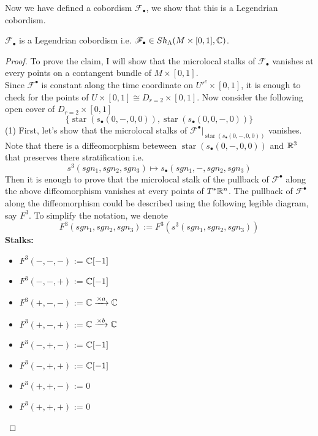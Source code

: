 Now we have defined a cobordism $\mathscr{F}_\bullet$, we show that this is a Legendrian cobordism.
\begin{proposition}
$\mathscr{F}_\bullet$ is a Legendrian cobordism i.e. $\mathscr{F}_\bullet \in Sh_\Lambda(M \times [0,1],\mathbb{C})$.
\end{proposition}
\begin{proof}
To prove the claim, I will show that the microlocal stalks of $\mathscr{F}_\bullet$ vanishes at every points on a contangent bundle of $M\times [0,1]$.\\
Since $\mathscr{F}^\bullet$ is constant along the time coordinate on $U'^c \times [0,1]$, it is enough to check for the points of $U\times [0,1] \cong D_{r=2}\times [0,1]$. Now consider the following open cover of $D_{r=2}\times [0,1]$
\[
\{\operatorname{star}(s_\bullet(0,-,0,0)),\operatorname{star}(s_\bullet(0,0,-,0))\}
\] 
(1) First, let's show that the microlocal stalks of $\mathscr{F}^\bullet|_{\operatorname{star}(s_\bullet(0,-,0,0))}$ vanishes. Note that there is a diffeomorphism beteween $\operatorname{star}(s_\bullet(0,-,0,0))$ and $\mathbb{R}^3$ that preserves there stratification i.e.
\[
s^3(sgn_1,sgn_2,sgn_3) \mapsto s_\bullet(sgn_1,-,sgn_2,sgn_3)
\]
Then it is enough to prove that the microlocal stalk of the pullback of $\mathscr{F}^\bullet$ along the above diffeomorphism vanishes at every points of $T^*\mathbb{R}^n$. The pullback of $\mathscr{F}^\bullet$ along the diffeomorphism could be described using the following legible diagram, say $F^3$. To simplify the notation, we denote
\[
F^3(sgn_1,sgn_2,sgn_3):= F^3(s^3(sgn_1,sgn_2,sgn_3))
\]
\textbf{Stalks:}
\begin{itemize}
\item $F^3(-,-,-)$ := $\mathbb{C}[-1]$
\item $F^3(-,-,+)$ := $\mathbb{C}[-1]$
\item $F^3(+,-,-)$ := $\mathbb{C}\xrightarrow{\times a} \mathbb{C}$
\item $F^3(+,-,+)$ := $\mathbb{C}\xrightarrow{\times b} \mathbb{C}$
\item $F^3(-,+,-)$ := $\mathbb{C}[-1]$
\item $F^3(-,+,+)$ := $\mathbb{C}[-1]$
\item $F^3(+,+,-)$ := $0$
\item $F^3(+,+,+)$ := $0$
\end{itemize}


\end{proof}
